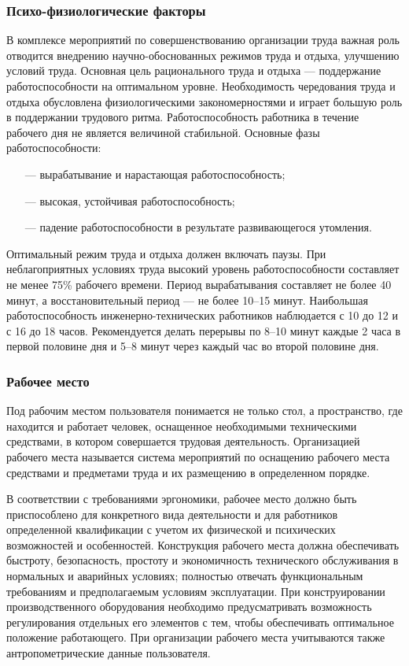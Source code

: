 \subsubsection{Психо-физиологические факторы}
\label{sec:bgd:trud:psych}
В комплексе мероприятий по совершенствованию организации труда важная роль отводится внедрению научно-обоснованных режимов труда и отдыха, улучшению условий труда.
Основная цель рационального труда и отдыха --- поддержание работоспособности на оптимальном уровне. Необходимость чередования труда и отдыха обусловлена физиологическими закономерностями и играет большую роль в поддержании трудового ритма.
Работоспособность работника в течение рабочего дня не является величиной стабильной. Основные фазы работоспособности:
\begin{itemize}
\item[---] вырабатывание и нарастающая работоспособность;
\item[---] высокая, устойчивая работоспособность;
\item[---] падение работоспособности в результате развивающегося утомления.
\end{itemize}
Оптимальный режим труда и отдыха должен включать паузы. При неблагоприятных условиях труда высокий уровень работоспособности составляет не менее 75\% рабочего времени. Период вырабатывания составляет не более 40 минут, а восстановительный период --- не более 10--15 минут.
Наибольшая работоспособность инженерно-технических работников наблюдается с 10 до 12 и с 16 до 18 часов. Рекомендуется делать перерывы по 8--10 минут каждые 2 часа в первой половине дня и 5--8 минут через каждый час во второй половине дня.

\subsubsection{Рабочее место}
\label{sec:bgd:trud:workplace}
Под рабочим местом пользователя понимается не только стол, а пространство, где находится и работает человек, оснащенное необходимыми техническими средствами, в котором совершается трудовая деятельность. Организацией рабочего места называется система мероприятий по оснащению рабочего места средствами и предметами труда и их размещению в определенном порядке.

В соответствии с требованиями эргономики, рабочее место должно быть приспособлено для конкретного вида деятельности и для работников определенной квалификации с учетом их физической и психических возможностей и особенностей. Конструкция рабочего места должна обеспечивать быстроту, безопасность, простоту и экономичность технического обслуживания в нормальных и аварийных условиях; полностью отвечать функциональным требованиям и предполагаемым условиям эксплуатации. При конструировании производственного оборудования необходимо предусматривать возможность регулирования отдельных его элементов с тем, чтобы обеспечивать оптимальное положение работающего. При организации рабочего места учитываются также антропометрические данные пользователя.

